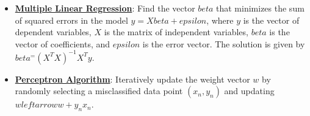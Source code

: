 \documentclass{article}%
\begin{document}
\begin{itemize}[leftmargin=*]%
\item \href{https://purdue.brightspace.com/d2l/common/assets/pdfjs-d2l-dist/1.0.14-legacy/web/viewer.html?file=\%2Fcontent\%2Fenforced\%2F1095467-wl.202510.CS.24300.001\%2F05L2-ML Basics.pdf\%3Fou\%3D1095467\&lang=en-us\&container=d2l-fileviewer-rendered-pdf\&fullscreen=d2l-fileviewer-rendered-pdf-dialog\&height=667#page=11}{\textbf{Multiple Linear Regression}}: Find the vector $ beta$ that minimizes the sum of squared errors in the model $y = X beta +  epsilon$, where $y$ is the vector of dependent variables, $X$ is the matrix of independent variables, $ beta$ is the vector of coefficients, and $ epsilon$ is the error vector. The solution is given by $ beta^ = (X^TX)^{-1}X^Ty$.%
\item \href{https://purdue.brightspace.com/d2l/common/assets/pdfjs-d2l-dist/1.0.14-legacy/web/viewer.html?file=\%2Fcontent\%2Fenforced\%2F1095467-wl.202510.CS.24300.001\%2F05L2-ML Basics.pdf\%3Fou\%3D1095467\&lang=en-us\&container=d2l-fileviewer-rendered-pdf\&fullscreen=d2l-fileviewer-rendered-pdf-dialog\&height=667#page=30}{\textbf{Perceptron Algorithm}}: Iteratively update the weight vector $w$ by randomly selecting a misclassified data point $(x_n, y_n)$ and updating $w  leftarrow w + y_nx_n$.%
\end{itemize}%
\end{document}
